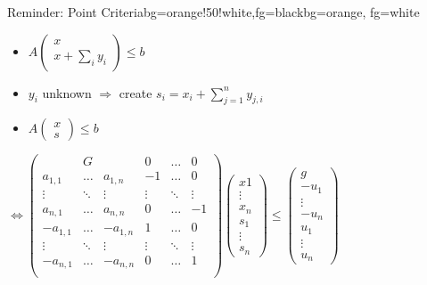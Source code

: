 \begin{frame}
	\begin{variableblock}{Reminder: Point Criteria}{bg=orange!50!white,fg=black}{bg=orange, fg=white}
		\begin{itemize}
			\setlength{\itemindent}{1cm}
			\item[(point)] $A\begin{pmatrix} x \\ x + \sum_i y_i \end{pmatrix} \le b$
		\end{itemize}
	\end{variableblock}
	\begin{itemize}
		\item $y_i$ unknown $\Rightarrow$ create $s_i=x_i+\sum_{j=1}^n y_{j,i}$
		\item<1> $A\begin{pmatrix} x \\ s \end{pmatrix} \le b$ \newline
	\end{itemize}
	$\Leftrightarrow \begin{pmatrix}
	& G 		& 			& 0 	 & \dots  & 0 \\
	a_{1,1}  & \dots 	& a_{1,n}	& -1 	 & \dots  & 0 \\
	\vdots   & \ddots 	& \vdots	& \vdots & \ddots & \vdots \\
	a_{n,1}  & \dots 	& a_{n,n}	& 0 	 & \dots  & -1 \\
	-a_{1,1} & \dots 	& -a_{1,n}	& 1 	 & \dots  & 0 \\
	\vdots   & \ddots 	& \vdots	& \vdots & \ddots & \vdots \\
	-a_{n,1} & \dots 	& -a_{n,n}	& 0 	 & \dots  & 1 \\
	\end{pmatrix} \begin{pmatrix} x1 \\ \vdots \\ x_n \\ s_1 \\ \vdots \\ s_n\end{pmatrix} \le \begin{pmatrix} g \\ -u_1 \\ \vdots\\ -u_n \\ u_1 \\ \vdots \\ u_n \end{pmatrix}$\\ %
\end{frame}

